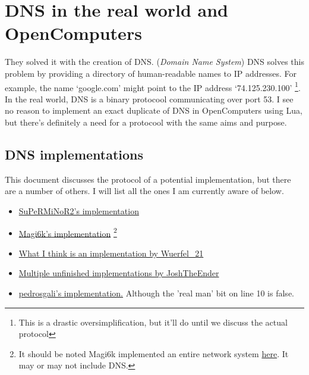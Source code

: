 \documentclass[]{report}
\begin{document}
\section{DNS in the real world and OpenComputers}
 They solved it with the creation of DNS. (\textit{Domain Name System}) DNS solves this problem by providing a directory of human-readable names to IP addresses. For example, the name `google.com' might point to the IP address `74.125.230.100' \footnote{This is a drastic oversimplification, but it'll do until we discuss the actual protocol}. In the real world, DNS is a binary protocool communicating over port 53. I see no reason to implement an exact duplicate of DNS in OpenComputers using Lua, but there's definitely a need for a protocool with the same aims and purpose. 
\subsection{DNS implementations}
 This document discusses the protocol of a potential implementation, but there are a number of others. I will list all the ones I am currently aware of below.
\begin{itemize}
	\item \href{https://github.com/OpenPrograms/SuPeRMiNoR2-Programs/blob/master/networking/dns.lua}{SuPeRMiNoR2's implementation}
	\item
	\href{http://oc.cil.li/index.php?/topic/215-dns-system/}{Magi6k's implementation} \footnote{It should be noted Magi6k implemented an entire network system \href{https://github.com/OpenPrograms/Magik6k-Programs/tree/master/network}{here}. It may or may not include DNS.}
	\item
	\href{https://github.com/OpenPrograms/Wuerfel_21-OC-Toolkit/tree/master/snl}{What I think is an implementation by Wuerfel\_21}
	\item
	\href{https://github.com/OpenPrograms/JoshTheEnder-Programs}{Multiple unfinished implementations by JoshTheEnder}
	\item
	\href{http://pastebin.com/pxFY89UZ}{pedrosgali's implementation.} Although the 'real man' bit on line 10 is false.
\end{itemize}
\appendix
\end{document}
